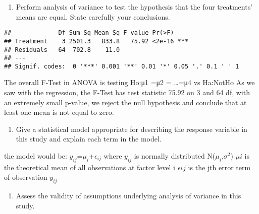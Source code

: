 \documentclass[]{article}
\newenvironment{Shaded}{\begin{snugshade}}{\end{snugshade}}
\newcommand{\KeywordTok}[1]{\textcolor[rgb]{0.13,0.29,0.53}{\textbf{#1}}}
\newcommand{\DataTypeTok}[1]{\textcolor[rgb]{0.13,0.29,0.53}{#1}}
\newcommand{\StringTok}[1]{\textcolor[rgb]{0.31,0.60,0.02}{#1}}
\newcommand{\OperatorTok}[1]{\textcolor[rgb]{0.81,0.36,0.00}{\textbf{#1}}}
\newcommand{\NormalTok}[1]{#1}
\providecommand{\tightlist}{%
  \setlength{\itemsep}{0pt}\setlength{\parskip}{0pt}}
\begin{document}
\begin{enumerate}
\def\labelenumi{\Alph{enumi})}
\tightlist
\item
  Perform analysis of variance to test the hypothesis that the four
  treatments' means are equal. State carefully your conclusions.
\end{enumerate}

\begin{Shaded}
\end{Shaded}

\begin{verbatim}
##             Df Sum Sq Mean Sq F value Pr(>F)    
## Treatment    3 2501.3   833.8   75.92 <2e-16 ***
## Residuals   64  702.8    11.0                   
## ---
## Signif. codes:  0 '***' 0.001 '**' 0.01 '*' 0.05 '.' 0.1 ' ' 1
\end{verbatim}

The overall F-Test in ANOVA is testing Ho:μ1 =μ2 = \ldots{}=μ4 vs
Ha:NotHo As we saw with the regression, the F-Test has test statistic
75.92 on 3 and 64 df, with an extremely small p-value, we reject the
null hypothesis and conclude that at least one mean is not equal to
zero.

\begin{enumerate}
\def\labelenumi{\Alph{enumi})}
\setcounter{enumi}{1}
\tightlist
\item
  Give a statistical model appropriate for describing the response
  variable in this study and explain each term in the model.
\end{enumerate}

the model would be: \(y_{ij}\)=\(\mu_{i}\)+\(\epsilon_{ij}\) where
\(y_{ij}\) is normally distributed N(\(\mu_{i}\),\(\sigma^2\))
\(\mu{i}\) is the theoretical mean of all observations at factor level i
\(\epsilon{ij}\) is the jth error term of observation \(y_{ij}\)

\begin{enumerate}
\def\labelenumi{\Alph{enumi})}
\setcounter{enumi}{2}
\tightlist
\item
  Assess the validity of assumptions underlying analysis of variance in
  this study.
\end{enumerate}
\end{document}
